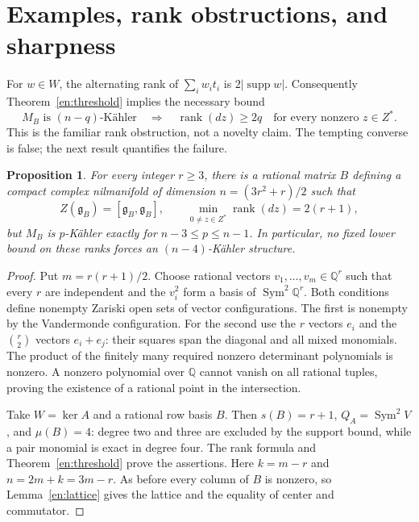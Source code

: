 \documentclass[12pt]{amsart}
\newcommand{\propword}{Proposition}
\newtheorem{prop}[thm]{\propword}
\theoremstyle{definition}
\theoremstyle{remark}
\numberwithin{equation}{section}
\DeclareMathOperator{\Sym}{Sym}
\newcommand{\Q}{\mathbb{Q}}
\begin{document}
\section{Examples, rank obstructions, and sharpness}
For $w\in W$, the alternating rank of $\sum_i w_i t_i$ is
$2|\operatorname{supp}w|$. Consequently Theorem~\ref{en:threshold} implies
the necessary bound
\begin{equation}\label{en:rank-bound}
 M_B\text{ is }(n-q)\text{-K\"ahler}
 \quad\Longrightarrow\quad
 \operatorname{rank}(dz)\geq2q
 \quad\text{for every nonzero }z\in Z^*.
\end{equation}
This is the familiar rank obstruction, not a novelty claim.
The tempting converse is false; the next result quantifies the failure.

\begin{prop}\label{en:large-rank}
For every integer $r\geq3$, there is a rational matrix $B$ defining a compact
complex nilmanifold of dimension
$n=(3r^2+r)/2$ such that
\[
 Z(\mathfrak g_B)=[\mathfrak g_B,\mathfrak g_B],\qquad
 \min_{0\ne z\in Z^*}\operatorname{rank}(dz)=2(r+1),
\]
but $M_B$ is $p$-K\"ahler exactly for $n-3\leq p\leq n-1$.
In particular, no fixed lower bound on these ranks forces an
$(n-4)$-K\"ahler structure.
\end{prop}
\begin{proof}
Put $m=r(r+1)/2$. Choose rational vectors $v_1,\ldots,v_m\in\Q^r$ such
that every $r$ are independent and the $v_i^2$ form a basis of
$\Sym^2\Q^r$. Both conditions define nonempty Zariski open sets of vector
configurations. The first is nonempty by the Vandermonde configuration.
For the second use the $r$ vectors $e_i$ and the $\binom r2$ vectors
$e_i+e_j$: their squares span the diagonal and all mixed monomials.
The product of the finitely many required nonzero determinant polynomials
is nonzero. A nonzero polynomial over $\Q$ cannot vanish on all rational
tuples, proving the existence of a rational point in the intersection.

Take $W=\ker A$ and a rational row basis $B$. Then $s(B)=r+1$,
$Q_A=\Sym^2V$, and $\mu(B)=4$: degree two and three are excluded by the
support bound, while a pair monomial is exact in degree four.
The rank formula and Theorem~\ref{en:threshold} prove the assertions.
Here $k=m-r$ and $n=2m+k=3m-r$. As before every column of $B$ is nonzero,
so Lemma~\ref{en:lattice} gives the lattice and the equality of center and
commutator.
\end{proof}
\end{document}
